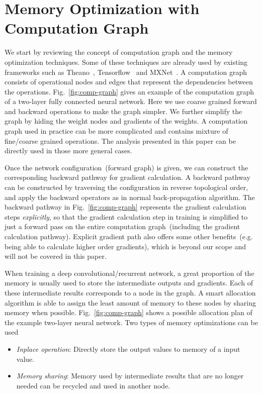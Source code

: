 \section{Memory Optimization with Computation Graph}\label{sec:comp-graph}

We start by reviewing the concept of computation graph and the memory optimization techniques. Some of these techniques are already used by existing frameworks such as Theano~\cite{bergstra+al:2010-scipy,Bastien-Theano-2012}, Tensorflow~\cite{tensorflow2015-whitepaper} and MXNet~\cite{MXNet-whitepaper}. A computation graph consists of operational nodes and edges that represent the dependencies between the operations.
Fig.~\ref{fig:comp-graph} gives an example of the computation graph of a two-layer fully connected neural network. Here we use coarse grained forward and backward operations to make the graph simpler. We further simplify the graph by hiding the weight nodes and gradients of the weights. A computation graph used in practice can be more complicated and contains mixture of fine/coarse grained operations. The analysis presented in this paper can be directly used in those more general cases.

Once the network configuration~(forward graph) is given, we can construct the corresponding backward pathway for gradient calculation. A backward pathway can be constructed by traversing the configuration in reverse topological order, and apply the backward operators as in normal back-propagation algorithm. The backward pathway in Fig.~\ref{fig:comp-graph} represents the gradient calculation steps \emph{explicitly}, so that the gradient calculation step in training is simplified to just a forward pass on the entire computation graph~(including the gradient calculation pathway). Explicit gradient path also offers some other benefits~(e.g. being able to calculate higher order gradients), which is beyond our scope and will not be covered in this paper.

When training a deep convolutional/recurrent network, a great proportion of the memory is usually used to store the intermediate outputs and gradients. Each of these intermediate results corresponds to a node in the graph. A smart allocation algorithm is able to assign the least amount of memory to these nodes by sharing memory when possible. Fig.~\ref{fig:comp-graph} shows a possible allocation plan of the example two-layer neural network. Two types of memory optimizations can be used

\begin{itemize}
   \item \emph{Inplace operation}: Directly store the output values to memory of a input value.
   \item \emph{Memory sharing}: Memory used by intermediate results that are no longer needed can be recycled and used in another node.
\end{itemize}

